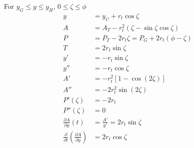 For $y_G \le y \le y_H$, $0 \le \zeta \le \phi$
\begin{equation}
\begin{aligned}
y & = y_C + r_t \cos \zeta \\
A & = A_T - r_t^2(\zeta - \sin \zeta \cos \zeta) \\
P & = P_T - 2 r_t \zeta = P_G + 2 r_t (\phi - \zeta) \\
T & = 2r_t \sin \zeta \\
y' & = -r_t \sin \zeta \\
y'' & = -r_t \cos \zeta \\
A' &= - r_t^2[1 - \cos(2\zeta)] \\
A'' &= -2  r_t^2 \sin(2\zeta) \\
P'(\zeta) & = -2 r_t \\
P''(\zeta) & = 0 \\
\frac{\partial A}{\partial y}(t) &= \frac{A'}{y'} = 2 r_t \sin \zeta \\
\frac{\partial}{\partial t}\left( \frac{\partial A}{\partial y}\right) &=  2 r_t \cos \zeta\\
\end{aligned}
\end{equation}


